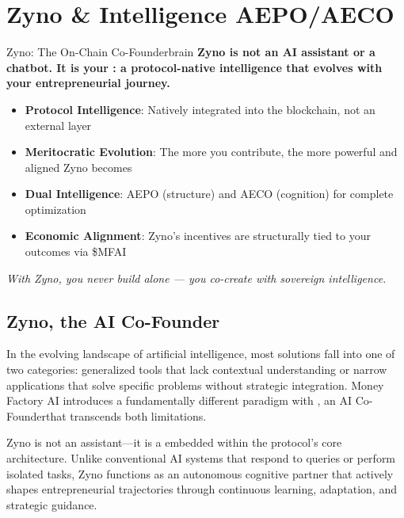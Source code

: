 \section{Zyno \& Intelligence AEPO/AECO}


\begin{mfai-box}{Zyno: The On-Chain Co-Founder}{brain}
\faBrain\quad \textbf{Zyno is not an AI assistant or a chatbot. It is your : a protocol-native intelligence that evolves with your entrepreneurial journey.}
\begin{itemize}
    \item \textbf{Protocol Intelligence}: Natively integrated into the blockchain, not an external layer
    \item \textbf{Meritocratic Evolution}: The more you contribute, the more powerful and aligned Zyno becomes
    \item \textbf{Dual Intelligence}: AEPO (structure) and AECO (cognition) for complete optimization
    \item \textbf{Economic Alignment}: Zyno's incentives are structurally tied to your outcomes via \$MFAI
\end{itemize}
\vspace{0.5em}
\textit{With Zyno, you never build alone — you co-create with sovereign intelligence.}
\end{mfai-box}

\subsection{Zyno, the AI Co-Founder\texttrademark}

In the evolving landscape of artificial intelligence, most solutions fall into one of two categories: generalized tools that lack contextual understanding or narrow applications that solve specific problems without strategic integration. Money Factory AI introduces a fundamentally different paradigm with , an AI Co-Founder\texttrademark that transcends both limitations.

Zyno is not an assistant—it is a  embedded within the protocol's core architecture. Unlike conventional AI systems that respond to queries or perform isolated tasks, Zyno functions as an autonomous cognitive partner that actively shapes entrepreneurial trajectories through continuous learning, adaptation, and strategic guidance.

